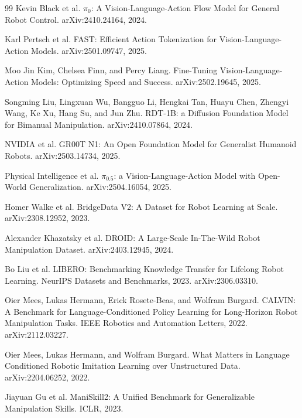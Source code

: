 \documentclass[11pt,oneside,openany]{oblivoir}
\numberwithin{section}{chapter}
\numberwithin{subsection}{section}
\numberwithin{equation}{chapter}
\begin{document}
\begin{thebibliography}{99}
Kevin Black et al.
\newblock $\pi_0$: A Vision-Language-Action Flow Model for General Robot Control.
\newblock arXiv:2410.24164, 2024.

Karl Pertsch et al.
\newblock FAST: Efficient Action Tokenization for Vision-Language-Action Models.
\newblock arXiv:2501.09747, 2025.

Moo Jin Kim, Chelsea Finn, and Percy Liang.
\newblock Fine-Tuning Vision-Language-Action Models: Optimizing Speed and Success.
\newblock arXiv:2502.19645, 2025.

Songming Liu, Lingxuan Wu, Bangguo Li, Hengkai Tan, Huayu Chen,
Zhengyi Wang, Ke Xu, Hang Su, and Jun Zhu.
\newblock RDT-1B: a Diffusion Foundation Model for Bimanual Manipulation.
\newblock arXiv:2410.07864, 2024.

NVIDIA et al.
\newblock GR00T N1: An Open Foundation Model for Generalist Humanoid Robots.
\newblock arXiv:2503.14734, 2025.

Physical Intelligence et al.
\newblock $\pi_{0.5}$: a Vision-Language-Action Model with Open-World Generalization.
\newblock arXiv:2504.16054, 2025.

Homer Walke et al.
\newblock BridgeData V2: A Dataset for Robot Learning at Scale.
\newblock arXiv:2308.12952, 2023.

Alexander Khazatsky et al.
\newblock DROID: A Large-Scale In-The-Wild Robot Manipulation Dataset.
\newblock arXiv:2403.12945, 2024.

Bo Liu et al.
\newblock LIBERO: Benchmarking Knowledge Transfer for Lifelong Robot Learning.
\newblock NeurIPS Datasets and Benchmarks, 2023. arXiv:2306.03310.

Oier Mees, Lukas Hermann, Erick Rosete-Beas, and Wolfram Burgard.
\newblock CALVIN: A Benchmark for Language-Conditioned Policy Learning for Long-Horizon Robot Manipulation Tasks.
\newblock IEEE Robotics and Automation Letters, 2022. arXiv:2112.03227.

Oier Mees, Lukas Hermann, and Wolfram Burgard.
\newblock What Matters in Language Conditioned Robotic Imitation Learning over Unstructured Data.
\newblock arXiv:2204.06252, 2022.

Jiayuan Gu et al.
\newblock ManiSkill2: A Unified Benchmark for Generalizable Manipulation Skills.
\newblock ICLR, 2023.


\end{thebibliography}
\end{document}
